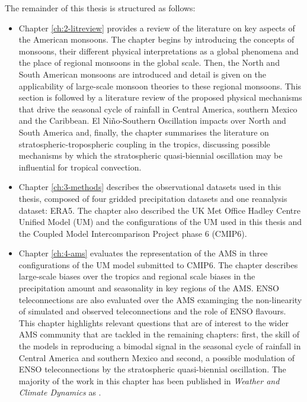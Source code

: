 The remainder of this thesis is structured as follows:

\begin{itemize}
\item Chapter \ref{ch:2-litreview} provides a review of the literature on key aspects of the American monsoons. The chapter begins by introducing the concepts of monsoons, their different physical interpretations as a global phenomena and the place of regional monsoons in the global scale. Then, the North and South American monsoons are introduced and detail is given on the applicability of large-scale monsoon theories to these regional monsoons. This section is followed by a literature review of the proposed physical mechanisms that drive the seasonal cycle of rainfall in Central America, southern Mexico and the Caribbean. El Niño-Southern Oscillation  impacts over North and South America and, finally, the chapter summarises the literature on stratospheric-tropospheric coupling in the tropics, discussing possible mechanisms by which the stratospheric quasi-biennial oscillation may be influential for tropical convection. 

\item  Chapter \ref{ch:3-methods} describes the observational datasets used in this thesis, composed of four gridded precipitation datasets and one reanalysis dataset: ERA5. The chapter also described the UK Met Office Hadley Centre Unified Model (UM) and the configurations of the UM used in this thesis and the Coupled Model Intercomparison Project phase 6 (CMIP6). 

\item Chapter \ref{ch:4-ams} evaluates the representation of the AMS  in three configurations of the UM model submitted to CMIP6. The chapter describes large-scale biases over the tropics and regional scale biases in the precipitation amount and seasonality in key regions of the AMS. 
ENSO teleconnections are also evaluated over the AMS examinging the non-linearity of simulated and observed teleconnections and the role of ENSO flavours. This chapter highlights relevant questions that are of interest to the wider AMS community that are tackled in the remaining chapters: first, the skill of the models in reproducing a bimodal signal in the seasonal cycle of rainfall in Central America and southern Mexico and second, a possible modulation of ENSO teleconnections by the stratospheric quasi-biennial oscillation.
The majority of the work in this chapter has been published in \textit{Weather and Climate Dynamics} as \cite{garciafranco2020}.


\end{itemize}
